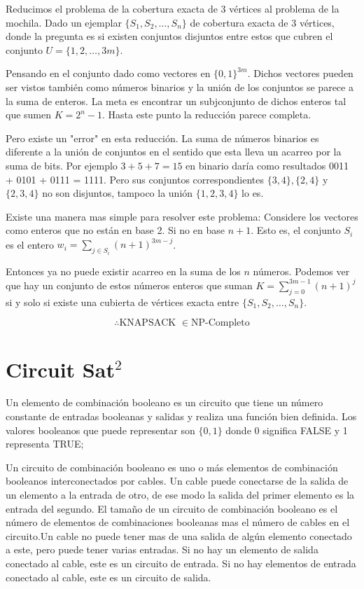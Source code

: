 \documentclass[letterpaper,12pt]{article}
\newcommand{\ecb}{elemento de combinación booleano }
\newcommand{\ccb}{circuito de combinación booleano }
\begin{document}
Reducimos el problema de la cobertura exacta de 3 vértices al problema de la 
mochila. Dado un ejemplar $\{ S_1, S_2, \dots, S_n \}$ de cobertura exacta de 3 
vértices, donde la pregunta es si existen conjuntos disjuntos entre estos que 
cubren el conjunto $U = \{1,2, \dots, 3m\}$.

Pensando en el conjunto dado como vectores en $\{  0,1 \}^{3m}$. Dichos vectores 
pueden ser vistos también como números binarios y la unión de los conjuntos se 
parece a la suma de enteros. La meta es encontrar un subjconjunto de dichos enteros 
tal que sumen $K = 2^n-1$. Hasta este punto la reducción parece completa.

Pero existe un "error" en esta reducción. La suma de números binarios es diferente 
a la unión de conjuntos en el sentido que esta lleva un acarreo por la suma de bits. 
Por ejemplo $3+5+7=15$ en binario daría como resultados 0011 + 0101 + 0111 = 1111. 
Pero sus conjuntos correspondientes $\{  3, 4 \}, \{ 2, 4 \}$ y $\{ 2, 3, 4 \}$ no 
son disjuntos, tampoco la unión $\{ 1, 2, 3, 4 \}$ lo es.

Existe una manera mas simple para resolver este problema: Considere los vectores 
como enteros que no están en base 2. Si no en base $n+1$. Esto es, el conjunto $S_i$ 
es el entero $w_i  = \sum_{j \in S_i} (n+1)^{3m-j}$.

Entonces ya no puede existir acarreo en la suma de los $n$ números. Podemos ver que 
hay un conjunto de estos números enteros que suman $K = \sum_{j = 0}^{3m-1} (n+1)^j$ 
si y solo si existe una cubierta de vértices exacta entre $\{  S_1, S_2, \dots, S_n \}$.

$$ \therefore \text{KNAPSACK } \in \text{NP-Completo} $$

\section{Circuit Sat$^{2}$}

Un \ecb es un circuito que tiene un número constante de entradas booleanas y salidas y realiza una función bien definida.
Los valores booleanos que puede representar son $\{ 0,1 \}$ donde $0$ significa
FALSE y 1 representa TRUE;

Un \ccb es uno o más elementos de combinación booleanos interconectados por cables.
Un cable puede conectarse de la salida de un elemento a la entrada de otro, de 
ese modo la salida del primer elemento es la entrada del segundo. El tamaño de un 
\ccb es el número de elementos de combinaciones booleanas mas el número de 
cables en el circuito.Un cable no puede tener mas de una salida de algún elemento 
conectado a este, pero puede tener varias entradas. Si no hay un elemento de 
salida conectado al cable, este es un circuito de entrada. Si no hay elementos 
de entrada conectado al cable, este es un circuito de salida. 
\end{document}
